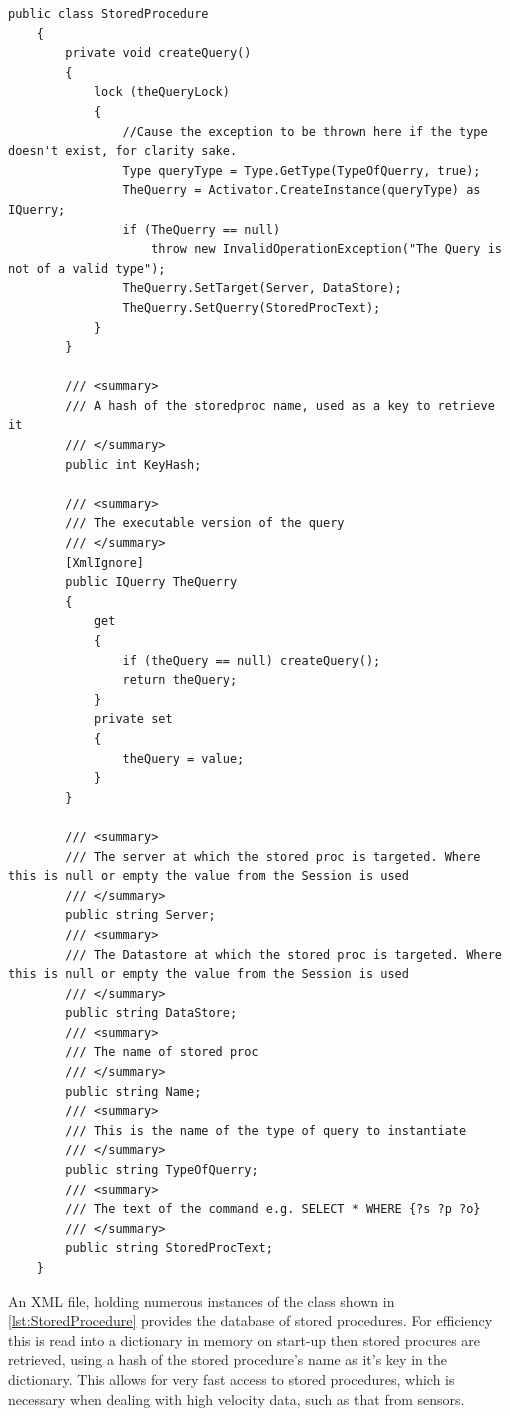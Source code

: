 \begin{lstlisting}[language={[Sharp]C},frame=tb,caption={The StoredProcedure class. Constructors, private fields and utility methods have been omitted for brevity.},label=lst:StoredProcedure]
 public class StoredProcedure
    {              
        private void createQuery()
        {
            lock (theQueryLock)
            {                
                //Cause the exception to be thrown here if the type doesn't exist, for clarity sake.
                Type queryType = Type.GetType(TypeOfQuerry, true);
                TheQuerry = Activator.CreateInstance(queryType) as IQuerry;
                if (TheQuerry == null)
                    throw new InvalidOperationException("The Query is not of a valid type");
                TheQuerry.SetTarget(Server, DataStore);
                TheQuerry.SetQuerry(StoredProcText);
            }
        }

        /// <summary>
        /// A hash of the storedproc name, used as a key to retrieve it
        /// </summary>
        public int KeyHash;

        /// <summary>
        /// The executable version of the query
        /// </summary>
        [XmlIgnore]
        public IQuerry TheQuerry
        {
            get
            {
                if (theQuery == null) createQuery();
                return theQuery;
            }
            private set
            {
                theQuery = value;
            }
        }

        /// <summary>
        /// The server at which the stored proc is targeted. Where this is null or empty the value from the Session is used
        /// </summary>
        public string Server;
        /// <summary>
        /// The Datastore at which the stored proc is targeted. Where this is null or empty the value from the Session is used
        /// </summary>
        public string DataStore;
        /// <summary>
        /// The name of stored proc
        /// </summary>
        public string Name;
        /// <summary>
        /// This is the name of the type of query to instantiate 
        /// </summary>
        public string TypeOfQuerry;
        /// <summary>
        /// The text of the command e.g. SELECT * WHERE {?s ?p ?o}
        /// </summary>
        public string StoredProcText;
    }
\end{lstlisting}

An XML file, holding numerous instances of the class shown in \autoref{lst:StoredProcedure} provides the database of stored procedures. For efficiency this is read into a dictionary in memory on start-up then stored procures are retrieved, using a hash of the stored procedure's name as it's key in the dictionary. This allows for very fast access to stored procedures, which is necessary when dealing with high velocity data, such as that from sensors.



